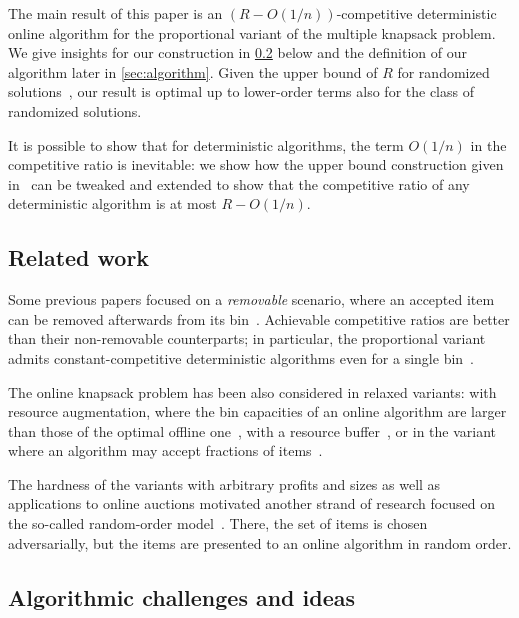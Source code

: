 \documentclass[a4paper,USenglish,cleveref]{lipics-v2019}
\newcommand{\R}{\ensuremath{R}}
\begin{document}
The main result of this paper is an $(\R-O(1/n))$-competitive deterministic
online algorithm for the proportional variant of the multiple knapsack problem.
We give insights for our construction in \cref{sec:idea} below and the
definition of our algorithm later in \cref{sec:algorithm}. Given the upper bound
of $\R$ for randomized solutions~\cite{CyJeSg16}, our result is optimal up to
lower-order terms also for the class of randomized solutions.

It is possible to show that for deterministic algorithms, 
the term $O(1/n)$ in the competitive 
ratio is inevitable: we show how the upper bound
construction given in~\cite{CyJeSg16} can be tweaked and extended to show that the
competitive ratio of any deterministic algorithm is at most $\R-O(1/n)$.



\subsection{Related work}

Some previous papers focused on a \emph{removable} scenario, where an accepted item can
be removed afterwards from its
bin~\cite{ABFLNE02,CyJeSg16,HaKaMa15,IwaTak02,IwaZha10}. Achievable competitive
ratios are better than their non-removable counterparts; in particular, the
proportional variant admits constant-competitive deterministic algorithms even
for a single bin~\cite{IwaTak02}.

The online knapsack problem has been also considered in relaxed variants: with
resource augmentation, where the bin capacities of an online algorithm are
larger than those of the optimal offline one~\cite{IwaZha10,NogSar05}, with a
resource buffer~\cite{HaKaMY19}, or in the variant where an algorithm may accept
fractions of items~\cite{NogSar05}.

The hardness of the variants with arbitrary profits and sizes as well as
applications to online auctions motivated another strand of research focused on
the so-called random-order model~\cite{AlKhLa19,BaImKK07,KeRaTV18,Vaze17}.
There, the set of items is chosen adversarially, but the items are presented to an
online algorithm in random order. 



\subsection{Algorithmic challenges and ideas}
\label{sec:idea}
\end{document}
